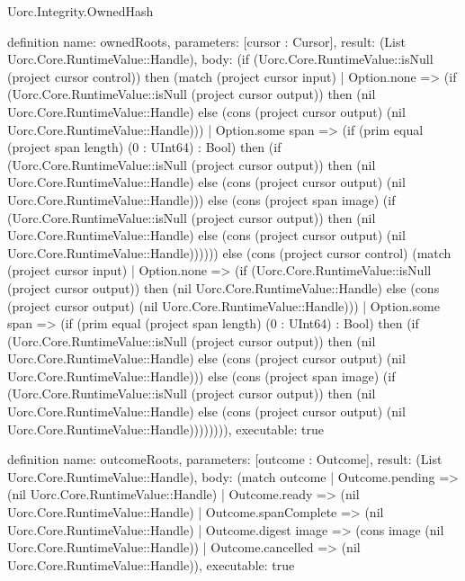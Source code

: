 \begin{lexlean}{Uorc.Integrity.OwnedHash}
\begin{semanticmodule}
definition{
  name: ownedRoots,
  parameters: [cursor : Cursor],
  result: (List Uorc.Core.RuntimeValue::Handle),
  body: (if (Uorc.Core.RuntimeValue::isNull (project cursor control)) then (match (project cursor input)
    | Option.none => (if (Uorc.Core.RuntimeValue::isNull (project cursor output)) then (nil Uorc.Core.RuntimeValue::Handle) else (cons (project cursor output) (nil Uorc.Core.RuntimeValue::Handle)))
    | Option.some span => (if (prim equal (project span length) (0 : UInt64) : Bool) then (if (Uorc.Core.RuntimeValue::isNull (project cursor output)) then (nil Uorc.Core.RuntimeValue::Handle) else (cons (project cursor output) (nil Uorc.Core.RuntimeValue::Handle))) else (cons (project span image) (if (Uorc.Core.RuntimeValue::isNull (project cursor output)) then (nil Uorc.Core.RuntimeValue::Handle) else (cons (project cursor output) (nil Uorc.Core.RuntimeValue::Handle)))))) else (cons (project cursor control) (match (project cursor input)
    | Option.none => (if (Uorc.Core.RuntimeValue::isNull (project cursor output)) then (nil Uorc.Core.RuntimeValue::Handle) else (cons (project cursor output) (nil Uorc.Core.RuntimeValue::Handle)))
    | Option.some span => (if (prim equal (project span length) (0 : UInt64) : Bool) then (if (Uorc.Core.RuntimeValue::isNull (project cursor output)) then (nil Uorc.Core.RuntimeValue::Handle) else (cons (project cursor output) (nil Uorc.Core.RuntimeValue::Handle))) else (cons (project span image) (if (Uorc.Core.RuntimeValue::isNull (project cursor output)) then (nil Uorc.Core.RuntimeValue::Handle) else (cons (project cursor output) (nil Uorc.Core.RuntimeValue::Handle)))))))),
  executable: true
}

definition{
  name: outcomeRoots,
  parameters: [outcome : Outcome],
  result: (List Uorc.Core.RuntimeValue::Handle),
  body: (match outcome
    | Outcome.pending => (nil Uorc.Core.RuntimeValue::Handle)
    | Outcome.ready => (nil Uorc.Core.RuntimeValue::Handle)
    | Outcome.spanComplete => (nil Uorc.Core.RuntimeValue::Handle)
    | Outcome.digest image => (cons image (nil Uorc.Core.RuntimeValue::Handle))
    | Outcome.cancelled => (nil Uorc.Core.RuntimeValue::Handle)),
  executable: true
}


\end{semanticmodule}
\end{lexlean}
